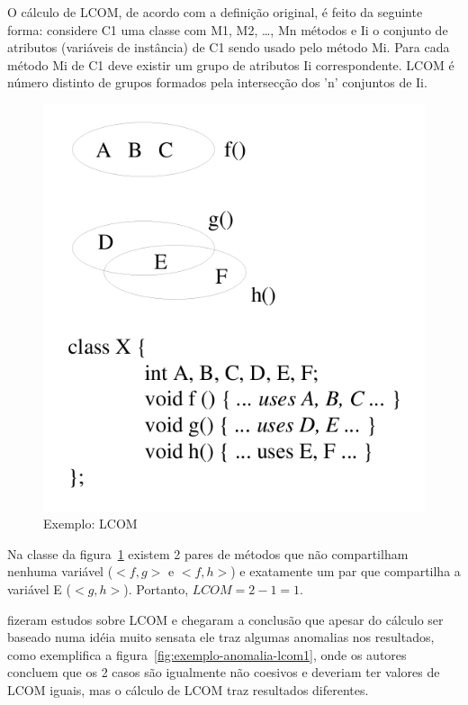 O cálculo de LCOM, de acordo com a definição original, é feito da seguinte
forma: considere C1 uma classe com M1, M2, \ldots, Mn métodos e Ii o conjunto
de atributos (variáveis de instância) de C1 sendo usado pelo método Mi. Para
cada método Mi de C1 deve existir um grupo de atributos Ii correspondente. LCOM
é número distinto de grupos formados pela intersecção dos 'n' conjuntos de Ii.

\begin{figure}[h]
\center
\includegraphics[scale=0.4]{imagens/exemplo-lcom1-hitz-e-montazeri}
\caption{Exemplo: LCOM \cite{measuringCouplingAndCohesion}}
\label{fig:exemplo-lcom1}
\end{figure}

Na classe da figura~\ref{fig:exemplo-lcom1} existem 2 pares de métodos que não
compartilham nenhuma variável ($<f, g>$ e $<f, h>$) e exatamente um par que
compartilha a variável E ($<g, h>$). Portanto, $LCOM = 2 - 1 = 1$.

 fizeram estudos sobre
LCOM e chegaram a conclusão que apesar do cálculo ser baseado numa idéia
muito sensata ele traz algumas anomalias nos resultados, como exemplifica a
figura~\ref{fig:exemplo-anomalia-lcom1}, onde os autores concluem que os 2
casos são igualmente não coesivos e deveriam ter valores de LCOM iguais, mas
o cálculo de LCOM traz resultados diferentes.


